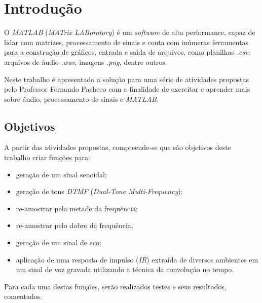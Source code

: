 \chapter*[Introdução]{Introdução}
	
	O \textit{MATLAB} (\textit{MATrix LABoratory}) é um \textit{software} de alta performance, capaz de lidar com matrizes, processamento de sinais e conta com inúmeras ferramentas para a construção de gráficos, entrada e saída de arquivos, como planilhas \textit{.csv}, arquivos de áudio \textit{.wav}, imagens \textit{.png}, dentre outros.
	
	Neste trabalho é apresentado a solução para uma série de atividades propostas pelo Professor Fernando Pacheco com a finalidade de exercitar e aprender mais sobre áudio, processamento de sinais e \textit{MATLAB}.
	
	\section[Objetivos]{Objetivos}
	
	A partir das atividades propostas, compreende-se que são objetivos deste trabalho criar funções para:
	
	\begin{itemize}
		\item geração de um sinal senoidal;
		\item geração de tons \textit{DTMF} (\textit{Dual-Tone Multi-Frequency});
		\item re-amostrar pela metade da frequência;
		\item re-amostrar pelo dobro da frequência;
		\item geração de um sinal de eco;
		\item aplicação de uma resposta de impulso (\textit{IR}) extraída de diversos ambientes em um sinal de voz gravada utilizando a técnica da convolução no tempo.
	\end{itemize}
	
	Para cada uma destas funções, serão realizados testes e seus resultados, comentados.